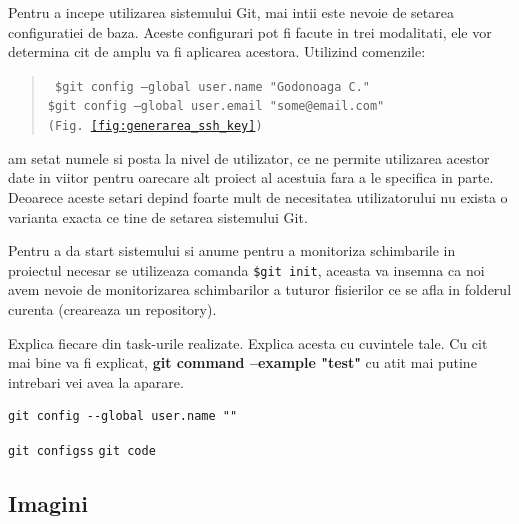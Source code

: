 Pentru a incepe utilizarea sistemului Git, mai intii este nevoie de setarea configuratiei de baza. Aceste configurari pot fi facute in trei modalitati, ele vor determina cit de amplu va fi aplicarea acestora.
Utilizind comenzile:
\begin{quote}\tt
	\$git config --global user.name "Godonoaga C."\\
	\$git config --global user.email "some@email.com" \hfill(Fig.~\ref{fig:generarea_ssh_key})
\end{quote}
am setat numele si posta la nivel de utilizator, ce ne permite utilizarea acestor date in viitor pentru oarecare alt proiect al acestuia fara a le specifica in parte.
Deoarece aceste setari depind foarte mult de necesitatea utilizatorului nu exista o varianta exacta ce tine de setarea sistemului Git.

Pentru a da start sistemului si anume pentru a monitoriza schimbarile in proiectul necesar se utilizeaza comanda {\tt \$git init}, aceasta va insemna ca noi avem nevoie de monitorizarea schimbarilor a tuturor fisierilor ce se afla in folderul curenta (creareaza un repository).




Explica fiecare din task-urile realizate. Explica acesta cu cuvintele tale. Cu cit mai bine va fi explicat, 
\textbf{git command --example "test"}
cu atit mai putine intrebari vei avea la aparare.

\begin{lstlisting}
git config --global user.name ""
\end{lstlisting}

\newcommand{\code}[1]{\texttt{#1}}
\code{git configss}
\tt git code



\subsection{Imagini}

